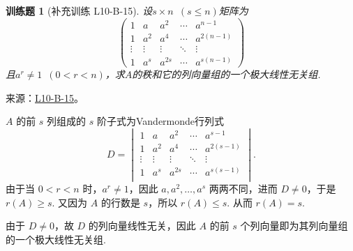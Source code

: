 \documentclass[UTF8,12pt,a4paper,fontset=fandol]{ctexart}
\newtheorem{exercise}{训练题}[section]
\begin{document}
\begin{exercise}[补充训练 L10-B-15]\label{prob:L10-B-15}
设$s \times n\enspace(s\leqslant n)$矩阵为
        \[\begin{pmatrix}
                1      & a      & a^2    & \cdots & a^{n-1}    \\
                1      & a^2    & a^4    & \cdots & a^{2(n-1)} \\
                \vdots & \vdots & \vdots & \ddots & \vdots     \\
                1      & a^s    & a^{2s} & \cdots & a^{s(n-1)}
            \end{pmatrix}\]
        且$a^r\neq 1\enspace(0<r<n)$，求$A$的秩和它的列向量组的一个极大线性无关组.
\end{exercise}
\noindent 来源：\href{https://github.com/yhwu-is/Linear-Algebra-Left-Undone/blob/new/%E8%AE%B2%E4%B9%89/%E4%B8%93%E9%A2%98/10%20%E8%A1%8C%E5%88%97%E5%BC%8F.tex}{L10-B-15}。
\begin{solve}
$A$ 的前 $s$ 列组成的 $s$ 阶子式为Vandermonde行列式
            \[D = \begin{vmatrix}
                    1      & a      & a^2    & \cdots & a^{s-1}    \\
                    1      & a^2    & a^4    & \cdots & a^{2(s-1)} \\
                    \vdots & \vdots & \vdots & \ddots & \vdots     \\
                    1      & a^s    & a^{2s} & \cdots & a^{s(s-1)} \\
                \end{vmatrix}.\]
            由于当 $0 < r < n$ 时，$a^r \neq 1$，因此 $a, a^2, \ldots, a^s$ 两两不同，进而 $D \neq 0$，于是 $r(A) \geqslant s$. 又因为 $A$ 的行数是 $s$，所以 $r(A) \leqslant s$. 从而 $r(A) = s$.

            由于 $D \neq 0$，故 $D$ 的列向量线性无关，因此 $A$ 的前 $s$ 个列向量即为其列向量组的一个极大线性无关组.
\end{solve}
\end{document}
